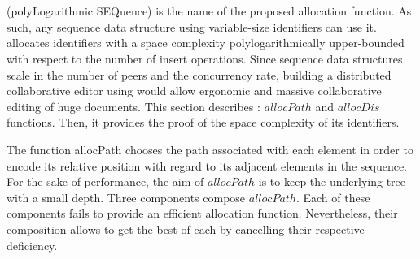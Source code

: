 
\section{\LSEQ}
\label{sec:proposal}

\LSEQ (polyLogarithmic SEQuence) is the name of the proposed allocation
function. As such, any sequence data structure using variable-size identifiers
can use it. \LSEQ allocates identifiers with a space complexity
polylogarithmically upper-bounded with respect to the number of insert
operations. Since sequence data structures scale in the number of peers and the
concurrency rate, building a distributed collaborative editor using \LSEQ
would allow ergonomic and massive collaborative editing of huge documents. This
section describes \LSEQ: $allocPath$ and $allocDis$ functions. Then, it
provides the proof of the space complexity of its identifiers.

\begin{asparadesc}
\item [The function allocPath] chooses the path associated with each element in
  order to encode its relative position with regard to its adjacent elements in
  the sequence. For the sake of performance, the aim of $allocPath$ is to keep
  the underlying tree with a small depth. Three components compose
  $allocPath$. Each of these components fails to provide an efficient
  allocation function. Nevertheless, their composition allows to get the best
  of each by cancelling their respective deficiency.
\end{asparadesc}

